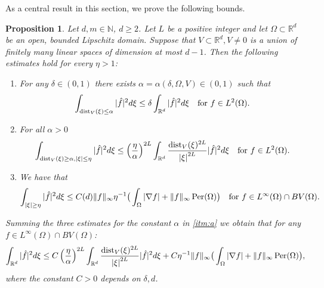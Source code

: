 \documentclass[a4paper, 10pt, twoside, notitlepage]{amsart}
\theoremstyle{plain}
\newtheorem{prop}{Proposition}[section]
\newcommand{\R}{\mathbb{R}}
\newcommand{\N}{\mathbb{N}}
\begin{document}
		
		As a central result in this section, we prove the following bounds.
		\begin{prop}\label{prop:key_estimate}
			Let $d,m \in \N$, $d \geq 2$. Let $L$ be a positive integer and let $\Omega \subset \R^d$ be an open, bounded Lipschitz domain. Suppose that $V\subset\R^d, V \neq 0$ is a union of finitely many linear spaces of dimension at most $d-1$. Then the following estimates hold for every $\eta > 1$:
			\renewcommand{\labelenumi}{\textbf{\theenumi}} \renewcommand{\theenumi}{(\roman{enumi})}
			\begin{enumerate}
				\item\label{itm:a} For any $\delta \in (0,1)$ there exists $\alpha  = \alpha(\delta,\Omega,V) \in (0,1)$ such that
				$$
				\int_{\dist_V(\xi)\leq \alpha} |\hat f|^2 d\xi \leq \delta \int_{\R^d} |\hat f|^2d\xi \quad\text{for }f\in L^2(\Omega).
				$$
				\item\label{itm:b} For all $\alpha>0$
				$$
				\int_{\dist_V(\xi)\geq \alpha,|\xi|\leq \eta}|\hat f|^2 d\xi \leq \left(\frac{\eta}{\alpha}\right)^{2L}\int_{\R^d}\frac{\dist_V(\xi)^{2L}}{{|\xi|}^{2L}}|\hat f|^2d\xi\quad\text{for
				}f\in L^2(\Omega).
				$$
				\item\label{itm:c} We have that
				$$
				\int_{|\xi|\geq\eta}|\hat f|^2 d\xi\leq C(d) \Vert f \Vert_\infty \eta^{-1} \big(\int_\Omega|\nabla f|+\Vert f \Vert_{\infty} \operatorname{Per}(\Omega)\big)\quad\text{for }f\in L^{\infty}(\Omega)\cap BV(\Omega).
				$$
			\end{enumerate}
			Summing the three estimates for the constant $\alpha$ in \ref{itm:a} we obtain that for any  $f\in L^{\infty}(\Omega)\cap BV(\Omega)$:
			$$
			\int_{\R^d}|\hat f|^2 d\xi\leq C \left(\frac{\eta}{\alpha}\right)^{2L}\int_{\R^d}\frac{\dist_V(\xi)^{2L}}{{|\xi|}^{2L}}|\hat f|^2d\xi+C\eta^{-1} \Vert f \Vert_\infty\big(\int_\Omega|\nabla
			f|+\Vert f \Vert_\infty \Per(\Omega)\big),
			$$
			where the constant $C>0$ depends on $\delta,d$.
		\end{prop}
		
		
		
\end{document}
